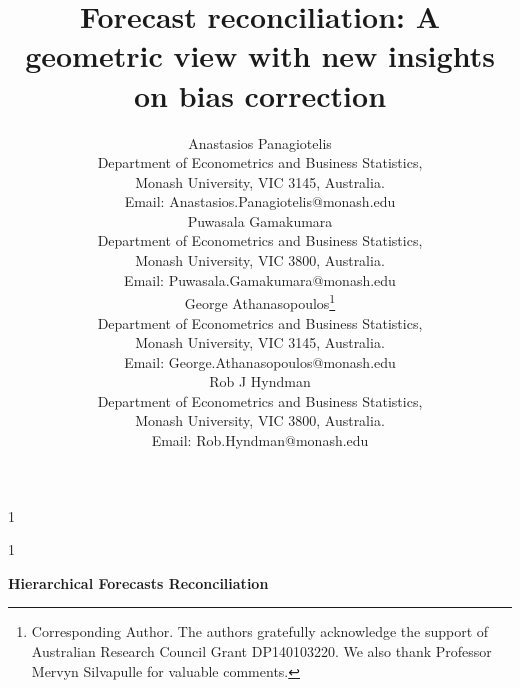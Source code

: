 \documentclass[12pt]{article}
\newcommand{\blind}{1}
\theoremstyle{definition}
\begin{document}
	
	
\blind
{
  \title{\bf Forecast reconciliation: A geometric view with new insights on bias correction}
  \author{Anastasios Panagiotelis\\
    Department of Econometrics and Business Statistics,\\
    Monash University, VIC 3145, Australia.\\
    Email: Anastasios.Panagiotelis@monash.edu \\[0.6cm]
    Puwasala Gamakumara\\
    Department of Econometrics and Business Statistics,\\
    Monash University, VIC 3800, Australia.\\
    Email: Puwasala.Gamakumara@monash.edu \\[0.6cm]
    George Athanasopoulos\thanks{Corresponding Author. The authors gratefully acknowledge the support of Australian Research Council Grant DP140103220. We also thank Professor Mervyn Silvapulle for valuable comments.}\hspace{.2cm}\\
    Department of Econometrics and Business Statistics,\\
    Monash University, VIC 3145, Australia.\\
    Email: George.Athanasopoulos@monash.edu \\[0.6cm]
    Rob J Hyndman\\
    Department of Econometrics and Business Statistics,\\
    Monash University, VIC 3800, Australia.\\
    Email: Rob.Hyndman@monash.edu\\[1.5cm]}
		\maketitle
	} \fi
	
	\blind
	{
		\bigskip
		\bigskip
		\bigskip
		\begin{center}
			{\LARGE\bf Hierarchical Forecasts Reconciliation}
		\end{center}
		\medskip
	} \fi

\newpage
\end{document}
